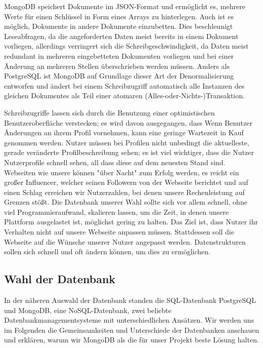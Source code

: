 MongoDB speichert Dokumente im JSON-Format und ermöglicht es, mehrere Werte für einen Schlüssel in Form eines Arrays zu hinterlegen. Auch ist es möglich, Dokumente in andere Dokumente einzubetten. Dies beschleunigt Leseabfragen, da die angeforderten Daten meist bereits in einem Dokument vorliegen, allerdings verringert sich die Schreibgeschwindigkeit, da Daten meist redundant in mehreren eingebetteten Dokumenten vorliegen und bei einer Änderung an mehreren Stellen überschrieben werden müssen. Anders als PostgreSQL ist MongoDB auf Grundlage dieser Art der Denormalisierung entworfen und ändert bei einem Schreibzugriff automatisch alle Instanzen des gleichen Dokumentes als Teil einer atomaren (Alles-oder-Nichts-)Transaktion.


Schreibzugriffe lassen sich durch die Benutzung einer optimistischen Benutzeroberfläche verstecken; es wird davon ausgegangen, dass 
Wenn Benutzer Änderungen an ihrem Profil vornehmen, kann eine geringe Wartezeit in Kauf genommen werden. Nutzer müssen bei Profilen nicht unbedingt die aktuelleste, gerade veränderte Profilbeschreibung sehen; es ist viel wichtiger, dass die Nutzer Nutzerprofile schnell sehen, all dass diese auf dem neuesten Stand sind. 
Webseiten wie unsere können "über Nacht" zum Erfolg werden, es reicht ein großer Influencer, welcher seinen Followern von der Webseite berichtet und auf einen Schlag erreichen wir Nutzerzahlen, bei denen unsere Rechenleistung auf Grenzen stößt. Die Datenbank unserer Wahl sollte sich vor allem schnell, ohne viel Programmieraufwand, skalieren lassen, um die Zeit, in denen unsere Plattform ausgelastet ist, möglichst gering zu halten. 
Das Ziel ist, dass Nutzer ihr Verhalten nicht auf unsere Webseite anpassen müssen. Stattdessen soll die Webseite auf die Wünsche unserer Nutzer angepasst werden. Datenstrukturen sollen sich schnell und oft ändern können, um dies zu ermöglichen.

\subsection{Wahl der Datenbank}
In der näheren Auswahl der Datenbank standen die SQL-Datenbank PostgreSQL und MongoDB, eine NoSQL-Datenbank, zwei beliebte Datenbankmanagementsysteme mit unterschiedlichen Ansätzen. Wir werden uns im Folgenden die Gemeinsamkeiten und Unterschiede der Datenbanken anschauen und erklären, warum wir MongoDB als die für unser Projekt beste Lösung halten.

